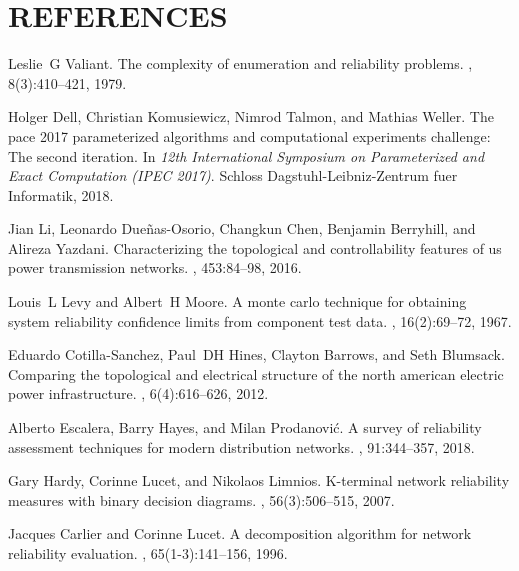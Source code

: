 \documentclass[12pt,twocolumn]{article}
\begin{document}

\section{REFERENCES}
{\small
\begin{thebibliography}{10}

Leslie~G Valiant.
\newblock The complexity of enumeration and reliability problems.
, 8(3):410--421, 1979.

Holger Dell, Christian Komusiewicz, Nimrod Talmon, and Mathias Weller.
\newblock The pace 2017 parameterized algorithms and computational experiments
  challenge: The second iteration.
\newblock In {\em 12th International Symposium on Parameterized and Exact
  Computation (IPEC 2017)}. Schloss Dagstuhl-Leibniz-Zentrum fuer Informatik,
  2018.

Jian Li, Leonardo Due{\~n}as-Osorio, Changkun Chen, Benjamin Berryhill, and
  Alireza Yazdani.
\newblock Characterizing the topological and controllability features of us
  power transmission networks.
,
  453:84--98, 2016.

Louis~L Levy and Albert~H Moore.
\newblock A monte carlo technique for obtaining system reliability confidence
  limits from component test data.
, 16(2):69--72, 1967.

Eduardo Cotilla-Sanchez, Paul~DH Hines, Clayton Barrows, and Seth Blumsack.
\newblock Comparing the topological and electrical structure of the north
  american electric power infrastructure.
, 6(4):616--626, 2012.

Alberto Escalera, Barry Hayes, and Milan Prodanovi{\'c}.
\newblock A survey of reliability assessment techniques for modern distribution
  networks.
, 91:344--357, 2018.

Gary Hardy, Corinne Lucet, and Nikolaos Limnios.
\newblock K-terminal network reliability measures with binary decision
  diagrams.
, 56(3):506--515, 2007.

Jacques Carlier and Corinne Lucet.
\newblock A decomposition algorithm for network reliability evaluation.
, 65(1-3):141--156, 1996.


\end{thebibliography}}
\end{document}
